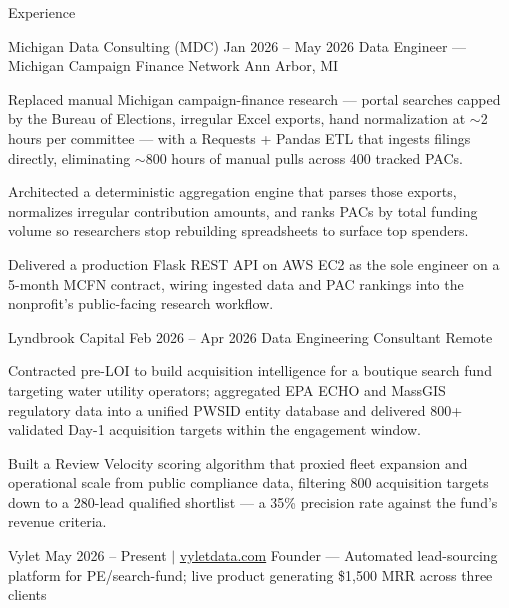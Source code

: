 \documentclass[
	11pt
]{../../../template}
\begin{document}
	\begin{rSection}{E}{xperience}
		\begin{rSectionEntry}
			{Michigan Data Consulting (MDC)}
			{Jan 2026 -- May 2026}
			{Data Engineer --- Michigan Campaign Finance Network}
			{}
			{Ann Arbor, MI}

			\item Replaced manual Michigan campaign-finance research --- portal searches capped by the Bureau of Elections, irregular Excel exports, hand normalization at $\sim$2 hours per committee --- with a Requests + Pandas ETL that ingests filings directly, eliminating $\sim$800 hours of manual pulls across 400 tracked PACs.
			\item Architected a deterministic aggregation engine that parses those exports, normalizes irregular contribution amounts, and ranks PACs by total funding volume so researchers stop rebuilding spreadsheets to surface top spenders.
			\item Delivered a production Flask REST API on AWS EC2 as the sole engineer on a 5-month MCFN contract, wiring ingested data and PAC rankings into the nonprofit's public-facing research workflow.
		\end{rSectionEntry}

		\begin{rSectionEntry}
			{Lyndbrook Capital}
			{Feb 2026 -- Apr 2026}
			{Data Engineering Consultant}
			{}
			{Remote}

			\item Contracted pre-LOI to build acquisition intelligence for a boutique search fund targeting water utility operators; aggregated EPA ECHO and MassGIS regulatory data into a unified PWSID entity database and delivered 800+ validated Day-1 acquisition targets within the engagement window.
			\item Built a Review Velocity scoring algorithm that proxied fleet expansion and operational scale from public compliance data, filtering 800 acquisition targets down to a 280-lead qualified shortlist --- a 35\% precision rate against the fund's revenue criteria.
		\end{rSectionEntry}

		\begin{rSectionEntry}
			{Vylet}
			{May 2026 -- Present $\vert$ \href{https://vyletdata.com}{vyletdata.com}}
			{Founder --- Automated lead-sourcing platform for PE/search-fund; live product generating \$1,500 MRR across three clients}
			{}
			{}


\end{rSectionEntry}
\end{rSection}
\end{document}
